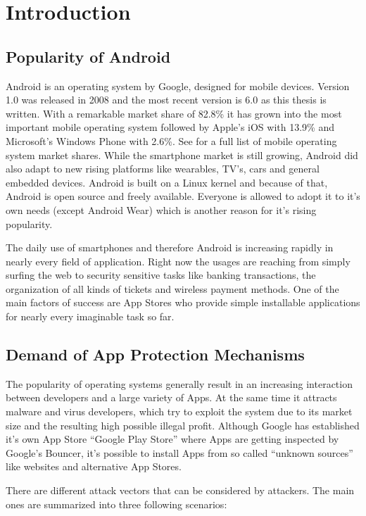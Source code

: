 \chapter{Introduction}\label{chapter:android_status_quo}

\section{Popularity of Android}
Android is an operating system by Google,
designed for mobile devices. Version 1.0 was released
in 2008 and the most recent version is 6.0 as this thesis
is written. With a remarkable market share of 82.8\%
it has grown into the most important mobile operating system
followed by Apple's iOS with 13.9\% and Microsoft's Windows
Phone with 2.6\%. See \parencite{marketshare} for a full list
of mobile operating system market shares. While the smartphone
market is still growing, Android did also adapt to new
rising platforms like wearables, TV's, cars and general
embedded devices. Android is built on a Linux kernel
and because of that, Android is open source and freely
available. Everyone is allowed to adopt it to it's own needs
(except Android Wear) which is another reason for it's
rising popularity.

The daily use of smartphones and therefore Android is increasing
rapidly in nearly every field of application. Right now the usages
are reaching from simply surfing the web to security sensitive tasks
like banking transactions, the organization of all kinds of tickets
and wireless payment methods.
One of the main factors of success are App Stores who provide simple
installable applications for nearly every imaginable task so far.

\section{Demand of App Protection Mechanisms}
The popularity of operating systems generally result in an increasing interaction between developers and a large variety of Apps. At the same time it attracts malware and virus developers, which try to exploit the system due to its market size and the resulting high possible illegal profit.
Although Google has established it's own App Store
``Google Play Store'' where Apps are getting inspected by Google's Bouncer,
it's possible to install Apps from so called ``unknown sources''
like websites and alternative App Stores.

There are different attack vectors that can be considered by attackers.
The main ones are summarized into three following scenarios:


